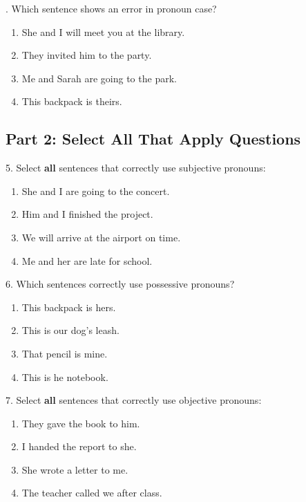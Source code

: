 \documentclass[12pt]{article}
\begin{document}
\vspace{1cm}
. Which sentence shows an error in pronoun case?  
\begin{enumerate}[label=\Alph*.]
    \item She and I will meet you at the library.  
    \item They invited him to the party.  
    \item Me and Sarah are going to the park.  
    \item This backpack is theirs.  
\end{enumerate}

\vspace{1cm}

\subsection*{Part 2: Select All That Apply Questions}

5. Select \textbf{all} sentences that correctly use subjective pronouns:  
\begin{enumerate}[label=\Alph*.]
    \item She and I are going to the concert.  
    \item Him and I finished the project.  
    \item We will arrive at the airport on time.  
    \item Me and her are late for school.  
\end{enumerate}

\vspace{1cm}

6. Which sentences correctly use possessive pronouns?  
\begin{enumerate}[label=\Alph*.]
    \item This backpack is hers.  
    \item This is our dog’s leash.  
    \item That pencil is mine.  
    \item This is he notebook.  
\end{enumerate}


7. Select \textbf{all} sentences that correctly use objective pronouns:  
\begin{enumerate}[label=\Alph*.]
    \item They gave the book to him.  
    \item I handed the report to she.  
    \item She wrote a letter to me.  
    \item The teacher called we after class.  
\end{enumerate}
\end{document}
